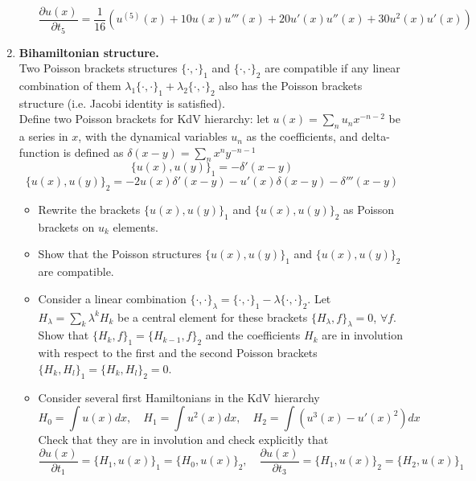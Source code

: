 \documentclass[12pt]{article}
\theoremstyle{definition}
\begin{document}
\begin{enumerate}
\begin{itemize}
\begin{equation}
            \boxed{\frac{\partial u(x)}{\partial t_5}=\frac{1}{16}(u^{(5)}(x)+10u(x)u'''(x)+20u'(x)u''(x)+30u^2(x)u'(x))}
        \end{equation}
    \end{itemize}
    \item \textbf{Bihamiltonian structure.}\\
    Two Poisson brackets structures $\{\cdot,\cdot\}_1$ and $\{\cdot,\cdot\}_2$ are compatible if any linear combination of them $\lambda_1\{\cdot,\cdot\}_1+\lambda_2\{\cdot,\cdot\}_2$ also has the Poisson brackets structure (i.e. Jacobi identity is satisfied).\\
    Define two Poisson brackets for KdV hierarchy: let $u(x) = \sum\limits_nu_nx^{-n-2}$ be a series in $x$, with the dynamical variables $u_n$ as the coefficients, and delta-function is defined as $\delta(x-y)=\sum\limits_nx^ny^{-n-1}$
    \begin{equation}
        \{u(x),u(y)\}_1=-\delta'(x-y)
    \end{equation}
    \begin{equation}
        \{u(x),u(y)\}_2=-2u(x)\delta'(x-y)-u'(x)\delta(x-y)-\delta'''(x-y)
    \end{equation}
    \begin{itemize}
        \item Rewrite the brackets $\{u(x),u(y)\}_1$ and $\{u(x),u(y)\}_2$ as Poisson brackets on $u_k$ elements.
        \item Show that the Poisson structures $\{u(x),u(y)\}_1$ and $\{u(x),u(y)\}_2$ are compatible.
        \item Consider a linear combination $\{\cdot,\cdot\}_\lambda=\{\cdot,\cdot\}_1-\lambda\{\cdot,\cdot\}_2$. Let $H_\lambda=\sum\limits_k\lambda^kH_k$ be a central element for these brackets $\{H_\lambda,f\}_\lambda= 0$, $\forall f$. Show that $\{H_k, f\}_1=\{H_{k-1},f\}_2$ and the coefficients $H_k$ are in involution with respect to the first and the second Poisson brackets $\{H_k, H_l\}_1 = \{H_k, H_l\}_2 = 0$.
        \item Consider several first Hamiltonians in the KdV hierarchy
        \begin{equation}
            H_0=\int u(x)dx,\quad H_1=\int u^2(x)dx,\quad H_2=\int(u^3(x)-u'(x)^2)dx
        \end{equation}
        Check that they are in involution and check explicitly that
        \begin{equation}
            \frac{\partial u(x)}{\partial t_1}=\{H_1,u(x)\}_1=\{H_0,u(x)\}_2,\quad\frac{\partial u(x)}{\partial t_3}=\{H_1,u(x)\}_2=\{H_2,u(x)\}_1

\end{equation}
\end{itemize}
\end{enumerate}
\end{document}
